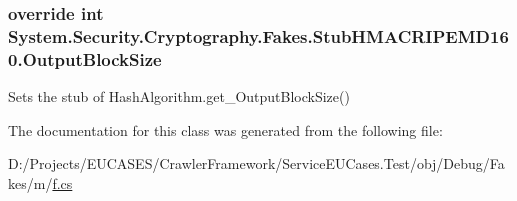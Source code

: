\hypertarget{class_system_1_1_security_1_1_cryptography_1_1_fakes_1_1_stub_h_m_a_c_r_i_p_e_m_d160_a4b9411ca6bd57e0845a24f54b1842aeb}{
\subsubsection[{Output\-Block\-Size}]{\setlength{\rightskip}{0pt plus 5cm}override int System.\-Security.\-Cryptography.\-Fakes.\-Stub\-H\-M\-A\-C\-R\-I\-P\-E\-M\-D160.\-Output\-Block\-Size\hspace{0.3cm}{\ttfamily [get]}}}\label{class_system_1_1_security_1_1_cryptography_1_1_fakes_1_1_stub_h_m_a_c_r_i_p_e_m_d160_a4b9411ca6bd57e0845a24f54b1842aeb}


Sets the stub of Hash\-Algorithm.\-get\-\_\-\-Output\-Block\-Size()



The documentation for this class was generated from the following file\-:\begin{DoxyCompactItemize}
\item 
D\-:/\-Projects/\-E\-U\-C\-A\-S\-E\-S/\-Crawler\-Framework/\-Service\-E\-U\-Cases.\-Test/obj/\-Debug/\-Fakes/m/\hyperlink{m_2f_8cs}{f.\-cs}\end{DoxyCompactItemize}
